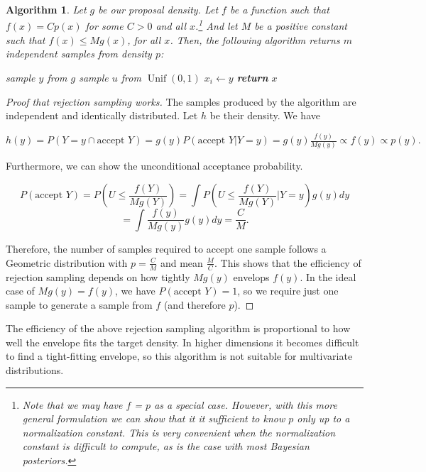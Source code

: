 \documentclass{book}
\theoremstyle{plain}%
\newtheorem{algo}{Algorithm}[section]
\theoremstyle{definition}
\DeclareMathOperator{\Unif}{Unif}
\begin{document}
\begin{algo}
Let $g$ be our proposal density. Let $f$ be a function such that $f(x) = Cp(x)$ for some $C > 0$ and all $x$.\footnote{Note that we may have $f$ = $p$ as a special case. However, with this more general formulation we can show that it it sufficient to know $p$ only up to a normalization constant. This is very convenient when the normalization constant is difficult to compute, as is the case with most Bayesian posteriors.} And let $M$ be a positive constant such that $f(x) \leq Mg(x)$, for all $x$. Then, the following algorithm returns $m$ independent samples from density $p$:

\begin{algorithmic}[1]
 
    \Repeat {}
                \State sample $y$ from $g$
                \State sample $u$ from $\Unif(0,1)$
                \State $x_i \gets y$
              \EndFor
              \State \textbf{return} $x$
        \EndProcedure
    \end{algorithmic}
\end{algo}

\begin{proof}[Proof that rejection sampling works] The samples produced by the algorithm are independent and identically distributed. Let $h$ be their density. We have

$h(y) = P(Y = y \cap \text{accept } Y)= g(y)P(\text{accept } Y|Y = y) = g(y)\frac{f(y)}{Mg(y)} \propto f(y) \propto p(y).$

Furthermore, we can show the unconditional acceptance probability.

$$P(\text{accept } Y) = P\left(U \leq \frac{f(Y)}{Mg(Y)}\right) = \int P\left(U \leq \frac{f(Y)}{Mg(Y)}  \lvert Y = y\right)g(y)dy$$
$$ = \int \frac{f(y)}{Mg(y)} g(y)dy = \frac{C}{M}.$$

Therefore, the number of samples required to accept one sample follows a Geometric distribution with $p = \frac{C}{M}$ and mean $\frac{M}{C}$. This shows that the efficiency of rejection sampling depends on how tightly $Mg(y)$ envelops $f(y)$. In the ideal case of $Mg(y) = f(y)$, we have $P(\text{accept } Y) = 1$, so we require just one sample to generate a sample from $f$ (and therefore $p$).
\end{proof}

The efficiency of the above rejection sampling algorithm is proportional to how well the envelope fits the target density. In higher dimensions it becomes difficult to find a tight-fitting envelope, so this algorithm is not suitable for multivariate distributions.
\end{document}
